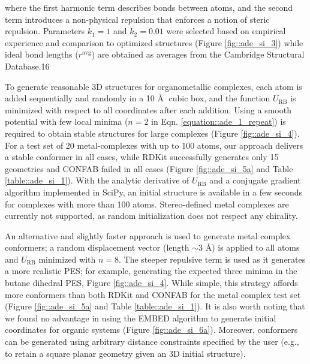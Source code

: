 \documentclass[../../main.tex]{subfiles}
\begin{document}
where the first harmonic term describes bonds between atoms, and the second term introduces a non-physical repulsion that enforces a notion of steric repulsion. Parameters $k_1 = 1$ and $k_2 = 0.01$ were selected based on empirical experience and comparison to optimized structures (Figure \ref{fig::ade_si_3}) while ideal bond lengths ($r^\text{avg}$) are obtained as averages from the Cambridge Structural Database.16

To generate reasonable 3D structures for organometallic complexes, each atom is added sequentially and randomly in a 10 \AA$\;$ cubic box, and the function $U_\text{RB}$ is minimized with respect to all coordinates after each addition. Using a smooth potential with few local minima ($n = 2$ in Eqn. \eqref{equation::ade_1_repeat}) is required to obtain stable structures for large complexes (Figure \ref{fig::ade_si_4}). For a test set of 20 metal-complexes with up to 100 atoms, our approach delivers a stable conformer in all cases, while RDKit successfully generates only 15 geometries and CONFAB failed in all cases (Figure \ref{fig::ade_si_5a} and Table \ref{table::ade_si_1}). With the analytic derivative of $U_\text{RB}$ and a conjugate gradient algorithm implemented in SciPy,\cite{SciPy} an initial structure is available in a few seconds for complexes with more than 100 atoms. Stereo-defined metal complexes are currently not supported, as random initialization does not respect any chirality.

An alternative and slightly faster approach is used to generate metal complex conformers; a random displacement vector (length $\sim3$ \AA) is applied to all atoms and $U_\text{RB}$ minimized with $n = 8$. The steeper repulsive term is used as it generates a more realistic PES; for example, generating the expected three minima in the butane dihedral PES, Figure \ref{fig::ade_si_4}. While simple, this strategy affords more conformers than both RDKit and CONFAB for the metal complex test set (Figure \ref{fig::ade_si_5a} and Table \ref{table::ade_si_1}). It is also worth noting that we found no advantage in using the EMBED algorithm\cite{Havel2002} to generate initial coordinates for organic systems (Figure \ref{fig::ade_si_6a}). Moreover, conformers can be generated using arbitrary distance constraints specified by the user (e.g., to retain a square planar geometry given an 3D initial structure).
\end{document}

